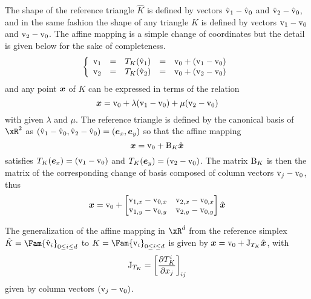 \medskip
The shape of the reference triangle $\hat K$ is defined by vectors $\hat{{\mathrm v}}_1 - \hat{{\mathrm v}}_0$ and $\hat{{\mathrm v}}_2 - \hat{{\mathrm v}}_0$, and in the same fashion the shape of any triangle $K$ is defined by vectors ${\mathrm v}_1 - {\mathrm v}_0$ and ${\mathrm v}_2 - {\mathrm v}_0$.
The affine mapping is a simple change of coordinates but the detail is given below for the sake of completeness.
\begin{equation*}
\left\lbrace
\begin{array}{lclcl}
{\mathrm v}_1 &=& T_K(\hat{{\mathrm v}}_1) &=& {\mathrm v}_0 + ({\mathrm v}_1 - {\mathrm v}_0)\\
{\mathrm v}_2 &=& T_K(\hat{{\mathrm v}}_2) &=& {\mathrm v}_0 + ({\mathrm v}_2 - {\mathrm v}_0)\\
\end{array}
\right.
\end{equation*}
and any point ${{\boldsymbol x}}$ of $K$ can be expressed in terms of the relation
\begin{equation*}
{{\boldsymbol x}} = {\mathrm v}_0 + \lambda ({\mathrm v}_1 - {\mathrm v}_0) + \mu ({\mathrm v}_2 - {\mathrm v}_0)
\end{equation*}
with given $\lambda$ and $\mu$.
The reference triangle is defined by the canonical basis of $\xR^2$ as $(\hat{{\mathrm v}}_1 - \hat{{\mathrm v}}_0, \hat{{\mathrm v}}_2 - \hat{{\mathrm v}}_0) = ({\boldsymbol e}_x, {\boldsymbol e}_y)$ so that the affine mapping
\begin{equation*}
{{\boldsymbol x}} = {\mathrm v}_0 + {\mathrm B}_K \hat{{{\boldsymbol x}}}
\end{equation*}
satisfies $T_K({\boldsymbol e}_x) = ({\mathrm v}_1 - {\mathrm v}_0)$ and $T_K({\boldsymbol e}_y) = ({\mathrm v}_2 - {\mathrm v}_0)$.
The matrix ${\mathrm B}_K$ is then the matrix of the corresponding change of basis composed of column vectors ${\mathrm v}_j - {\mathrm v}_0$, thus
\begin{equation*}
{{\boldsymbol x}} = {\mathrm v}_0 +
\begin{bmatrix}
{\mathrm v}_{1,x} - {\mathrm v}_{0,x} & {\mathrm v}_{2,x} - {\mathrm v}_{0,x}\\
{\mathrm v}_{1,y} - {\mathrm v}_{0,y} & {\mathrm v}_{2,y} - {\mathrm v}_{0,y}\\
\end{bmatrix}
\hat{{{\boldsymbol x}}}
\end{equation*}

\medskip
\begin{dfntn}
The generalization of the affine mapping in $\xR^d$ from the reference simplex $\hat K = \Fam{\hat\vertex_i}_{0\leq i\leq d}$ to $K = \Fam{\vertex_i}_{0\leq i\leq d}$ is given by ${{\boldsymbol x}} = {\mathrm v}_0 + {\mathrm J}_{T_K} \hat{{{\boldsymbol x}}}$,
with
\begin{equation*}
{\mathrm J}_{T_K} = \left[\frac{\partial T^i_{K}}{\partial x_j}  \right]_{ij}
\end{equation*}
given by column vectors $({\mathrm v}_j - {\mathrm v}_0)$.
\end{dfntn}

